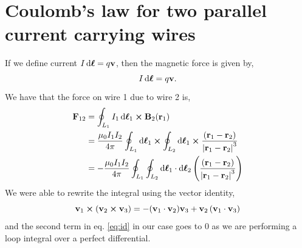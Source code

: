 \documentclass{book}
\begin{document}
\section{Coulomb's law for two parallel current carrying wires}
If we define current $I\dd{\vb*{\ell}} = q\vb{v}$, then the magnetic force is given by,
\begin{equation}
	 I \dd{\vb*{\ell}} = q\vb{v}.
\end{equation}
We have that the force on wire 1 due to wire 2 is,
\begin{equation}
	\begin{split}
		\vb{F}_{12} &= \oint_{L_1} I_1\dd{\vb*{\ell}_1} \cross \vb{B}_2(\vb{r}_1) \\
		& = \frac{\mu_0I_1I_2}{4\pi}\oint_{L_1}\dd{\vb*{\ell}_1}\cross\oint_{L_2}\dd{\vb*{\ell}_1} \cross \frac{\left(\vb{r}_1 - \vb{r}_2\right)}{\left|\vb{r}_1 - \vb{r}_2\right|^3} \\
		& = -\frac{\mu_0I_1I_2}{4\pi}\oint_{L_1}\oint_{L_2} \dd{\vb*{\ell}}_1\cdot\dd{\vb*{\ell}_2} \left(\frac{\left(\vb{r}_1 - \vb{r}_2\right)}{\left|\vb{r}_1 - \vb{r}_2\right|^3}\right)
	\end{split}
\end{equation}
We were able to rewrite the integral using the vector identity,
\begin{equation}
	\vb{v}_1 \cross \left(\vb{v}_2 \cross \vb{v}_3\right) = -(\vb{v}_1 \cdot \vb{v}_2)\vb{v}_3 + \vb{v}_2\left(\vb{v}_1 \cdot \vb{v}_3\right) \label{eq:id}
\end{equation}
and the second term in eq. \eqref{eq:id} in our case goes to 0 as we are performing a loop integral over a perfect differential.
\end{document}
